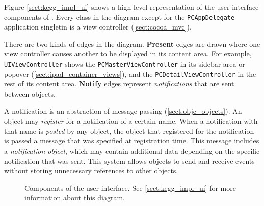 Figure \ref{sect:kegg_impl_ui} shows a high-level representation of the user
interface components of \keggapp. Every class in the diagram except for the
\texttt{PCAppDelegate} application singletin is a view controller
(\ref{sect:cocoa_mvc}).

There are two kinds of edges in the diagram. \textbf{Present} edges are drawn
where one view controller causes another to be displayed in its content area.
For example, \texttt{UIViewController} shows the \texttt{PCMasterViewController}
in its sidebar area or popover (\ref{sect:ipad_container_views}), and the
\texttt{PCDetailViewController} in the rest of its content area. \textbf{Notify}
edges represent \emph{notifications} that are sent between objects.

A notification is an abstraction of message passing (\ref{sect:objc_objects}).
An object may \emph{register} for a notification of a certain name. When a
notification with that name is \emph{posted} by any object, the object that
registered for the notification is passed a message that was specified at
registration time. This message includes a \emph{notification object}, which may
contain additional data depending on the specific notification that was sent.
This system allows objects to send and receive events without storing
unnecessary references to other objects.

\begin{figure}[tbhp]
    \caption{\label{fig:kegg_ui_arch} Components of the user interface. See
    \ref{sect:kegg_impl_ui} for more information about this diagram.}
\end{figure}

